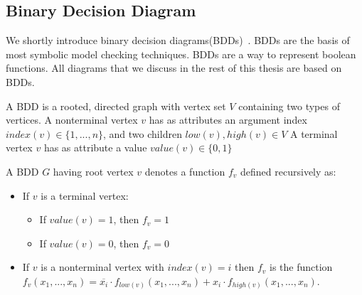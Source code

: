 \subsection{Binary Decision Diagram}
We shortly introduce binary decision diagrams(BDDs)~\cite{Bryant:1986:GAB:6432.6433}. BDDs are the basis of most symbolic model checking techniques. BDDs are a way to represent boolean functions. All diagrams that we discuss in the rest of this thesis are based on BDDs.

\begin{mydef}
A BDD is a rooted, directed graph with vertex set $V$ containing two types of vertices. A nonterminal vertex $v$ has as attributes an argument index $index(v) \in \{1,...,n\}$, and two children $low(v),high(v) \in V$ A terminal vertex $v$ has as attribute a value $value(v) \in \{0,1\}$
\end{mydef}

\begin{mydef}
A BDD $G$ having root vertex $v$ denotes a function $f_v$ defined recursively as:
\begin{itemize}
\item If $v$ is a terminal vertex:
\begin{itemize}
\item If $value(v)=1$, then $f_v=1$
\item If $value(v)=0$, then $f_v=0$
\end{itemize}
\item If $v$ is a nonterminal vertex with $index(v)=i$ then $f_v$ is the function
$f_v(x_1,...,x_n) = \overline{x_i}\cdot f_{low(v)}(x_1,...,x_n)+x_i\cdot f_{high(v)}(x_1,...,x_n)$.
\end{itemize}
\end{mydef}